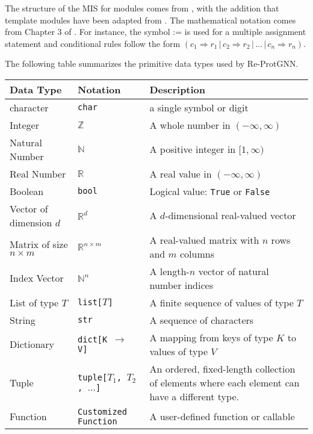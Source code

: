 \documentclass[12pt, titlepage]{article}
\begin{document}
The structure of the MIS for modules comes from \citet{HoffmanAndStrooper1995},
with the addition that template modules have been adapted from
\citet{GhezziEtAl2003}.  The mathematical notation comes from Chapter 3 of
\citet{HoffmanAndStrooper1995}.  For instance, the symbol := is used for a
multiple assignment statement and conditional rules follow the form $(c_1
\Rightarrow r_1 \,|\, c_2 \Rightarrow r_2 \,|\, \dots \,|\, c_n \Rightarrow r_n)$.

\vspace{1em}

The following table summarizes the primitive data types used by Re-ProtGNN. 

\begin{center}
\renewcommand{\arraystretch}{1.2}
\noindent 
\begin{tabular}{l l p{7.5cm}} 
\toprule 
\textbf{Data Type} & \textbf{Notation} & \textbf{Description}\\ 
\midrule
character & \texttt{char} & a single symbol or digit \\
Integer & $\mathbb{Z}$ & A whole number in $(-\infty, \infty)$ \\
Natural Number & $\mathbb{N}$ & A positive integer in $[1, \infty)$ \\
Real Number & $\mathbb{R}$ & A real value in $(-\infty, \infty)$ \\
Boolean & \texttt{bool} & Logical value: \texttt{True} or \texttt{False} \\
Vector of dimension $d$ & $\mathbb{R}^d$ & A $d$-dimensional real-valued vector \\
Matrix of size $n \times m$ & $\mathbb{R}^{n \times m}$ & A real-valued matrix with $n$ rows and $m$ columns \\
Index Vector & $\mathbb{N}^n$ & A length-$n$ vector of natural number indices \\
List of type $T$ & \texttt{list[$T$]} & A finite sequence of values of type $T$ \\
String & \texttt{str} & A sequence of characters \\
Dictionary & \texttt{dict[K $\rightarrow$ V]} & A mapping from keys of type $K$ to values of type $V$ \\
Tuple & \texttt{tuple[$T_1$, $T_2$, $\dots$]} & An ordered, fixed-length collection of elements where each element can have a different type. \\
Function & \texttt{Customized Function} & A user-defined function or callable \\
\bottomrule
\end{tabular} 
\end{center}
\end{document}
